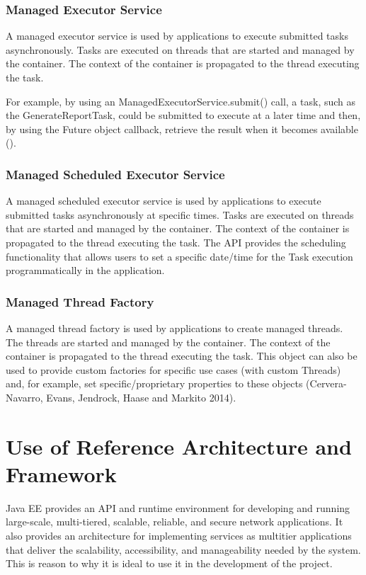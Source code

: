 \documentclass[12pt]{article}
\begin{document}
\subsubsection{Managed Executor Service}
A managed executor service is used by applications to execute submitted tasks asynchronously. Tasks are executed on threads that are
started and managed by the container. The context of the container is propagated to the thread executing the task.

For example, by using an ManagedExecutorService.submit() call, a task, such as the GenerateReportTask, could be submitted to execute at a later time and then, by using the Future object callback, retrieve the result when it becomes available ().

\subsubsection{Managed Scheduled Executor Service}
A managed scheduled executor service is used by applications to execute submitted tasks asynchronously at specific times. Tasks are executed on threads that are started and managed by the container. The context of the container is propagated to the thread executing the task. The API
provides the scheduling functionality that allows users to set a specific date/time for the Task execution programmatically in the application.

\subsubsection{Managed Thread Factory}
A managed thread factory is used by applications to create managed threads. The threads are started and managed by the container. The context of the container is propagated to the thread executing the task. This object can also be used to provide custom factories for specific use cases (with custom Threads) and, for example, set specific/proprietary properties to these objects (Cervera-Navarro, Evans, Jendrock, Haase and Markito 2014).


\section{Use of Reference Architecture and Framework}
Java EE provides an API and runtime environment for developing and running large-scale, multi-tiered, scalable, reliable, and secure network applications. It also provides an architecture for implementing services as multitier applications that deliver the scalability, accessibility, and manageability needed by the system. This is reason to why it is ideal to use it in the development of the project.
\end{document}

